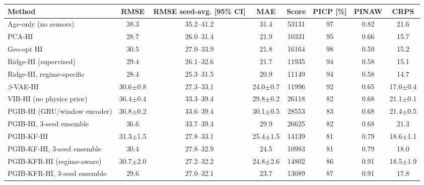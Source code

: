 \setlength{\tabcolsep}{4pt}\begin{tabular}{l c c c c c c c}
\hline
 Method & RMSE & RMSE seed-avg. [95\% CI] & MAE & Score & PICP [\%] & PINAW & CRPS \\
\hline
Age-only (no sensors) & 38.3 & 35.2--41.2 & 31.4 & 53131 & 97 & 0.82 & 21.6 \\
PCA-HI & 28.7 & 26.0--31.4 & 21.9 & 10331 & 95 & 0.66 & 15.7 \\
Geo-opt HI & 30.5 & 27.0--33.9 & 21.8 & 16164 & 98 & 0.59 & 15.2 \\
Ridge-HI (supervised) & 29.4 & 26.1--32.6 & 21.7 & 11935 & 94 & 0.58 & 15.1 \\
Ridge-HI, regime-specific & 28.4 & 25.3--31.5 & 20.9 & 11149 & 94 & 0.58 & 14.7 \\
$\beta$-VAE-HI & 30.6$\pm$0.8 & 27.3--33.1 & 24.0$\pm$0.7 & 11996 & 92 & 0.65 & 17.0$\pm$0.4 \\
VIB-HI (no physics prior) & 36.4$\pm$0.4 & 33.3--39.4 & 29.8$\pm$0.2 & 26118 & 82 & 0.68 & 21.1$\pm$0.1 \\
PGIB-HI (GRU/window encoder) & 36.8$\pm$0.2 & 33.6--39.4 & 30.1$\pm$0.5 & 28553 & 83 & 0.68 & 21.4$\pm$0.5 \\
PGIB-HI, 3-seed ensemble & 36.6 & 33.7--39.4 & 29.9 & 26625 & 82 & 0.68 & 21.3 \\
PGIB-KF-HI & 31.3$\pm$1.5 & 27.8--33.1 & 25.4$\pm$1.5 & 14139 & 81 & 0.79 & 18.6$\pm$1.1 \\
PGIB-KF-HI, 3-seed ensemble & 30.4 & 27.8--32.9 & 24.5 & 10983 & 81 & 0.79 & 18.0 \\
PGIB-KFR-HI (regime-aware) & 30.7$\pm$2.0 & 27.2--32.2 & 24.8$\pm$2.6 & 14802 & 86 & 0.91 & 18.5$\pm$1.9 \\
PGIB-KFR-HI, 3-seed ensemble & 29.6 & 27.0--32.1 & 23.7 & 13089 & 87 & 0.91 & 17.8 \\
\hline
\end{tabular}
